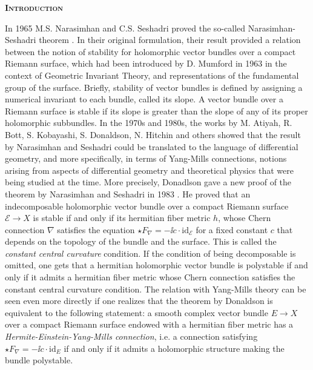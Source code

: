 {}
\begin{center}
    {\scshape\bfseries\Large Introduction}
\end{center}
\thispagestyle{introduction}
In 1965 M.S. Narasimhan and C.S. Seshadri proved the so-called Narasimhan-Seshadri theorem \parencite{NS1965}. In their original formulation, their result provided a relation between the notion of stability for holomorphic vector bundles over a compact Riemann surface, which had been introduced by D. Mumford in 1963 in the context of Geometric Invariant Theory, and representations of the fundamental group of the surface. Briefly, stability of vector bundles is defined by assigning a numerical invariant to each bundle, called its slope. A vector bundle over a Riemann surface is stable if its slope is greater than the slope of any of its proper holomorphic subbundles. In the 1970s and 1980s, the works by M. Atiyah, R. Bott, S. Kobayashi, S. Donaldson, N. Hitchin and others showed that the result by Narasimhan and Seshadri could be translated to the language of differential geometry, and more specifically, in terms of Yang-Mills connections, notions arising from aspects of differential geometry and theoretical physics that were being studied at the time. More precisely, Donadlson gave a new proof of the theorem by Narasimhan and Seshadri in 1983 \parencite{DonaldsonNS83}. He proved that an indecomposable holomorphic vector bundle over a compact Riemann surface \(\mathcal{E} \to X\) is stable if and only if its hermitian fiber metric \(h\), whose Chern connection \(\nabla\) satisfies the equation \(\star F_\nabla=-\ii c \cdot \mathrm{id}_{\mathcal{E}}\) for a fixed constant \(c\) that depends on the topology of the bundle and the surface. This is called the \textit{constant central curvature} condition. If the condition of being decomposable is omitted, one gets that a hermitian holomorphic vector bundle is polystable if and only if it admits a hermitian fiber metric whose Chern connection satisfies the constant central curvature condition. The relation with Yang-Mills theory can be seen even more directly if one realizes that the theorem by Donaldson is equivalent to the following statement: a smooth complex vector bundle \(E \to X\) over a compact Riemann surface endowed with a hermitian fiber metric has a \textit{Hermite-Einstein-Yang-Mills connection}, i.e. a connection satisfying \(\star F_\nabla=-\ii c \cdot \mathrm{id}_E\) if and only if it admits a holomorphic structure making the bundle polystable.
\\

